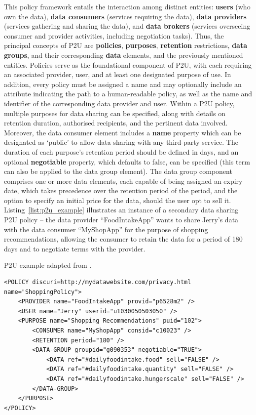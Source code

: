 This policy framework entails the interaction among distinct entities: \textbf{users} (who own the data), \textbf{data consumers} (services requiring the data), \textbf{data providers} (services gathering and sharing the data), and \textbf{data brokers} (services overseeing consumer and provider activities, including negotiation tasks).
Thus, the principal concepts of P2U are \textbf{policies}, \textbf{purposes}, \textbf{retention} restrictions, \textbf{data groups}, and their corresponding \textbf{data} elements, and the previously mentioned entities.
Policies serve as the foundational component of P2U, with each requiring an associated provider, user, and at least one designated purpose of use. 
In addition, every policy must be assigned a name and may optionally include an attribute indicating the path to a human-readable policy, as well as the name and identifier of the corresponding data provider and user. 
Within a P2U policy, multiple purposes for data sharing can be specified, along with details on retention duration, authorised recipients, and the pertinent data involved. 
Moreover, the data consumer element includes a \textbf{name} property which can be designated as `public' to allow data sharing with any third-party service. 
The duration of each purpose's retention period should be defined in days, and an optional \textbf{negotiable} property, which defaults to false, can be specified (this term can also be applied to the data group element).
The data group component comprises one or more data elements, each capable of being assigned an expiry date, which takes precedence over the retention period of the period, and the option to specify an initial price for the data, should the user opt to sell it.
Listing~\ref{list:p2u_example} illustrates an instance of a secondary data sharing P2U policy -- the data provider ``FoodIntakeApp'' wants to share Jerry's data with the data consumer ``MyShopApp'' for the purpose of shopping recommendations, allowing the consumer to retain the data for a period of 180 days and to negotiate terms with the provider.

\begin{listing}
\caption[P2U policy.]{P2U example adapted from \cite{iyilade_p2u_2014}.}
\label{list:p2u_example}
\begin{verbatim}
<POLICY discuri=http://mydatawebsite.com/privacy.html name="ShoppingPolicy">
    <PROVIDER name="FoodIntakeApp" provid="p6528m2" />
    <USER name="Jerry" userid="u1030050503050" />
    <PURPOSE name="Shopping Recommendations" puid="102">
        <CONSUMER name="MyShopApp" consid="c10023" />
        <RETENTION period="180" />
        <DATA-GROUP groupid="g090353" negotiable="TRUE">
            <DATA ref="#dailyfoodintake.food" sell="FALSE" />
            <DATA ref="#dailyfoodintake.quantity" sell="FALSE" />
            <DATA ref="#dailyfoodintake.hungerscale" sell="FALSE" />
        </DATA-GROUP>
    </PURPOSE>
</POLICY>
\end{verbatim}
\end{listing}

